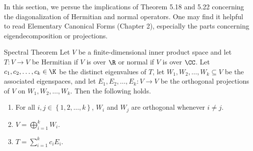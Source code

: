 \documentclass[linearalgebraII]{subfiles}
\begin{document}
    \begin{remark}
        In this section, we persue the implications of Theorem 5.18 and 5.22 concerning the diagonalization of Hermitian and normal operators. One may find it helpful to read Elementary Canonical Forms (Chapter 2), especially the parts concerning eigendecomposition or projections.
    \end{remark}

    \begin{theorem}{Spectral Theorem}
        Let $V$ be a finite-dimensional inner product space and let $T:V\to V$ be Hermitian if $V$ is over $\R$ or normal if $V$ is over $\CC$. Let $c_1,c_2,\ldots,c_k\in\K$ be the distinct eigenvalues of $T$, let $W_1,W_2,\ldots,W_k\subseteq V$ be the associated eigenspaces, and let $E_1,E_2,\ldots,E_k:V\to V$ be the orthogonal projections of $V$ on $W_1,W_2,\ldots,W_k$. Then the following holds.
        \begin{enumerate}
            \item For all $i,j\in\left\lbrace 1,2,\ldots,k \right\rbrace$, $W_i$ and $W_j$ are orthogonal whenever $i\neq j$.
            \item $V = \bigoplus^{k}_{i=1} W_i$.
            \item $T = \sum^{k}_{i=1} c_iE_i$.
        \end{enumerate}
    \end{theorem}
\end{document}

